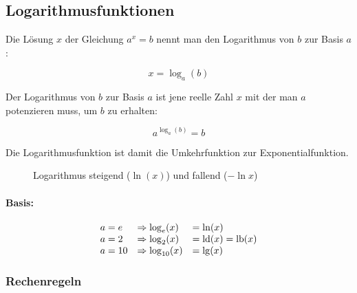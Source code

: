 \subsection{Logarithmusfunktionen}

Die Lösung \( x \) der Gleichung \( a^x = b \) nennt man
den Logarithmus von \( b \) zur Basis \( a \):

\[
	x = \log_a(b)
\]

Der Logarithmus von \( b \) zur Basis \( a \) ist jene reelle
Zahl \( x \) mit der man \( a \) potenzieren muss, um \( b \)
zu erhalten:

\[
	a^{\log_a(b)} = b
\]

Die Logarithmusfunktion ist damit die Umkehrfunktion zur
Exponentialfunktion.


\begin{figure}[H]
	\centering
	\caption{Logarithmus steigend (\( \ln(x) \)) und fallend (\( -\ln{x} \))}
\end{figure}


\paragraph{Basis:}
\begin{equation*}
	\begin{array}{lll}
		a = e  & \Rightarrow \log_e(x)    & = \ln(x)          \\
		a = 2  & \Rightarrow \log_2(x)    & = \operatorname{ld}(x) = \operatorname{lb}(x) \\
		a = 10 & \Rightarrow \log_{10}(x) & = \lg(x)
	\end{array}
\end{equation*}

\subsubsection{Rechenregeln}

